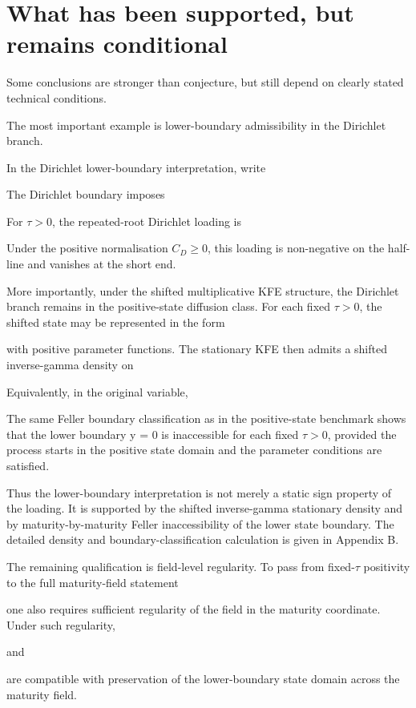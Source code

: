 \documentclass[11pt,oneside]{book}
\begin{document}
\section{What has been supported, but remains
conditional}\label{what-has-been-supported-but-remains-conditional}

Some conclusions are stronger than conjecture, but still depend on
clearly stated technical conditions.

The most important example is lower-boundary admissibility in the
Dirichlet branch.

In the Dirichlet lower-boundary interpretation, write

The Dirichlet boundary imposes

For $\tau>0$, the repeated-root Dirichlet loading is

Under the positive normalisation $C_D\geq0$, this loading is non-negative
on the half-line and vanishes at the short end.

More importantly, under the shifted multiplicative KFE structure, the
Dirichlet branch remains in the positive-state diffusion class. For each
fixed $\tau>0$, the shifted state may be represented in the
form

with positive parameter functions. The stationary KFE then admits a
shifted inverse-gamma density on

Equivalently, in the original variable,

The same Feller boundary classification as in the positive-state
benchmark shows that the lower boundary y = 0 is inaccessible for each
fixed $\tau>0$, provided the process starts in the positive
state domain and the parameter conditions are satisfied.

Thus the lower-boundary interpretation is not merely a static sign
property of the loading. It is supported by the shifted inverse-gamma
stationary density and by maturity-by-maturity Feller inaccessibility of
the lower state boundary. The detailed density and
boundary-classification calculation is given in Appendix B.

The remaining qualification is field-level regularity. To pass from
fixed-$\tau$ positivity to the full maturity-field statement

one also requires sufficient regularity of the field in the maturity
coordinate. Under such regularity,

and

are compatible with preservation of the lower-boundary state domain
across the maturity field.
\end{document}
